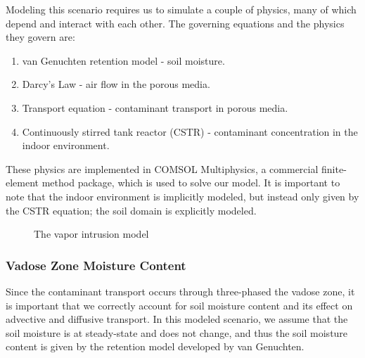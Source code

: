 Modeling this scenario requires us to simulate a couple of physics, many of which depend and interact with each other.
The governing equations and the physics they govern are:
\begin{enumerate}
  \item van Genuchten retention model - soil moisture.
  \item Darcy's Law - air flow in the porous media.
  \item Transport equation - contaminant transport in porous media.
  \item Continuously stirred tank reactor (CSTR) - contaminant concentration in the indoor environment.
\end{enumerate}
These physics are implemented in COMSOL Multiphysics, a commercial finite-element method package, which is used to solve our model.
It is important to note that the indoor environment is implicitly modeled, but instead only given by the CSTR equation; the soil domain is explicitly modeled.\par

\begin{figure}
  \caption{The vapor intrusion model}
  \label{fig:model}
\end{figure}

\subsubsection{Vadose Zone Moisture Content}

Since the contaminant transport occurs through three-phased the vadose zone, it is important that we correctly account for soil moisture content and its effect on advective and diffusive transport.
In this modeled scenario, we assume that the soil moisture is at steady-state and does not change, and thus the soil moisture content is given by the retention model developed by van Genuchten.\par

